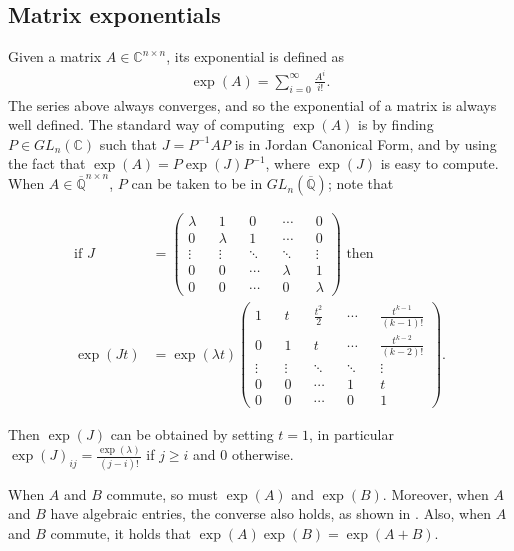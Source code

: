 \subsection{Matrix exponentials}

Given a matrix $A \in \mathbb{C}^{n \times n}$, its exponential is defined as
\begin{align*}
\exp(A) = \sum \limits_{i=0}^{\infty} \frac{A^{i}}{i!} .
\end{align*}
The series above always converges, and so the exponential of a matrix is always well defined. The standard way of computing $\exp(A)$ is by finding $P \in \mathit{GL}_{n}(\mathbb{C})$ such that $J=P^{-1}AP$ is in Jordan Canonical Form, and by using the fact that $\exp(A) = P \exp(J) P^{-1}$, where $\exp(J)$ is easy to compute. When $A \in \overline{\mathbb{Q}}^{n \times n}$, $P$ can be taken to be in $GL_{n}(\overline{\mathbb{Q}})$; note that

\begin{align*}
\mbox{if } J &= \begin{pmatrix}
\lambda && 1 && 0 && \cdots && 0 \\
0 && \lambda && 1 &&\cdots && 0 \\
\vdots && \vdots && \ddots && \ddots && \vdots \\
0 && 0 && \cdots && \lambda && 1 \\
0 && 0 && \cdots && 0 && \lambda
\end{pmatrix} \mbox{ then } \\
\exp(Jt) &= \exp(\lambda t) \begin{pmatrix}
1 && t && \frac{t^{2}}{2} && \cdots && \frac{t^{k-1}}{(k-1)!} \\
0 && 1 && t && \cdots && \frac{t^{k-2}}{(k-2)!} \\
\vdots && \vdots &&\ddots && \ddots && \vdots \\
0 && 0 && \cdots && 1 && t \\
0 && 0 && \cdots && 0 && 1
\end{pmatrix} .
\end{align*}

Then $\exp(J)$ can be obtained by setting $t=1$, in particular $\exp(J)_{ij} = \frac{\exp(\lambda)}{(j-i)!}$ if $j \geq i$ and $0$ otherwise.

When $A$ and $B$ commute, so must $\exp(A)$ and $\exp(B)$. Moreover, when $A$ and $B$ have algebraic entries, the converse also holds, as shown in \cite{MatrixExps}. Also, when $A$ and $B$ commute, it holds that $\exp(A)\exp(B) = \exp(A+B)$.

